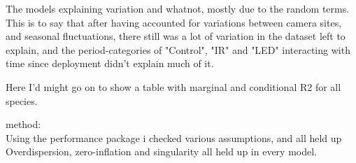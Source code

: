 The models explaining variation and whatnot, mostly due to the random terms. This is to say that after having accounted for variations between camera sites, and seasonal fluctuations, there still was a lot of variation in the dataset left to explain, and the period-categories of "Control", "IR" and "LED" interacting with time since deployment didn't explain much of it.

Here I'd might go on to show a table with marginal and conditional R2 for all species. 


method: \\
Using the performance package i checked various assumptions, and all held up %
Overdispersion, zero-inflation and singularity all held up in every model. 




